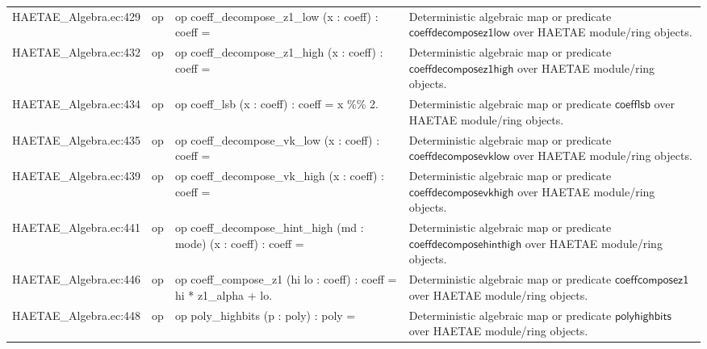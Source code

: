 \documentclass[10pt]{article}
\begin{document}
\begin{longtable}{L{0.11\textwidth}L{0.055\textwidth}L{0.385\textwidth}L{0.41\textwidth}}
HAETAE\_\allowbreak{}Algebra.\allowbreak{}ec:\allowbreak{}429 & op & {\ttfamily\scriptsize op coeff\_\allowbreak{}decompose\_\allowbreak{}z1\_\allowbreak{}low (x : coeff) : coeff =} & Deterministic algebraic map or predicate $\mathsf{coeffdecomposez1low}$ over HAETAE module/ring objects. \\
HAETAE\_\allowbreak{}Algebra.\allowbreak{}ec:\allowbreak{}432 & op & {\ttfamily\scriptsize op coeff\_\allowbreak{}decompose\_\allowbreak{}z1\_\allowbreak{}high (x : coeff) : coeff =} & Deterministic algebraic map or predicate $\mathsf{coeffdecomposez1high}$ over HAETAE module/ring objects. \\
HAETAE\_\allowbreak{}Algebra.\allowbreak{}ec:\allowbreak{}434 & op & {\ttfamily\scriptsize op coeff\_\allowbreak{}lsb (x : coeff) : coeff = x \%\% 2.} & Deterministic algebraic map or predicate $\mathsf{coefflsb}$ over HAETAE module/ring objects. \\
HAETAE\_\allowbreak{}Algebra.\allowbreak{}ec:\allowbreak{}435 & op & {\ttfamily\scriptsize op coeff\_\allowbreak{}decompose\_\allowbreak{}vk\_\allowbreak{}low (x : coeff) : coeff =} & Deterministic algebraic map or predicate $\mathsf{coeffdecomposevklow}$ over HAETAE module/ring objects. \\
HAETAE\_\allowbreak{}Algebra.\allowbreak{}ec:\allowbreak{}439 & op & {\ttfamily\scriptsize op coeff\_\allowbreak{}decompose\_\allowbreak{}vk\_\allowbreak{}high (x : coeff) : coeff =} & Deterministic algebraic map or predicate $\mathsf{coeffdecomposevkhigh}$ over HAETAE module/ring objects. \\
HAETAE\_\allowbreak{}Algebra.\allowbreak{}ec:\allowbreak{}441 & op & {\ttfamily\scriptsize op coeff\_\allowbreak{}decompose\_\allowbreak{}hint\_\allowbreak{}high (md : mode) (x : coeff) : coeff =} & Deterministic algebraic map or predicate $\mathsf{coeffdecomposehinthigh}$ over HAETAE module/ring objects. \\
HAETAE\_\allowbreak{}Algebra.\allowbreak{}ec:\allowbreak{}446 & op & {\ttfamily\scriptsize op coeff\_\allowbreak{}compose\_\allowbreak{}z1 (hi lo : coeff) : coeff = hi * z1\_\allowbreak{}alpha + lo.} & Deterministic algebraic map or predicate $\mathsf{coeffcomposez1}$ over HAETAE module/ring objects. \\
HAETAE\_\allowbreak{}Algebra.\allowbreak{}ec:\allowbreak{}448 & op & {\ttfamily\scriptsize op poly\_\allowbreak{}highbits (p : poly) : poly =} & Deterministic algebraic map or predicate $\mathsf{polyhighbits}$ over HAETAE module/ring objects. \\

\end{longtable}
\end{document}
